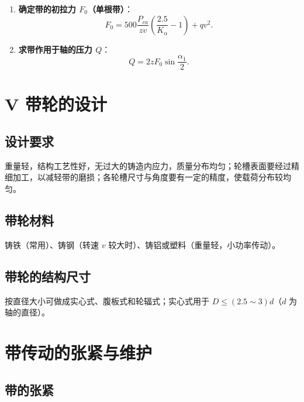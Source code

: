 \begin{enumerate}
	\item \textbf{确定带的初拉力 $F_0$（单根带）}：
	      \begin{equation}
		      F_0=500\frac{P_{ca}}{zv}\left(\frac{2.5}{K_\alpha}-1\right)+qv^2.
		      \label{eq:带传动:初拉力}
	      \end{equation}

	\item \textbf{求带作用于轴的压力 $Q$}：
	      \begin{equation}
		      Q=2zF_0\sin\frac{\alpha_1}{2}.
		      \label{eq:带传动:轴压力}
	      \end{equation}
\end{enumerate}

\section{V 带轮的设计}
\label{sec:带传动:带轮设计}

\subsection{设计要求}
\label{sec:带传动:带轮设计要求}

重量轻，结构工艺性好，无过大的铸造内应力，质量分布均匀；轮槽表面要经过精细加工，以减轻带的磨损；各轮槽尺寸与角度要有一定的精度，使载荷分布较均匀。

\subsection{带轮材料}
\label{sec:带传动:带轮材料}

铸铁（常用）、铸钢（转速 $v$ 较大时）、铸铝或塑料（重量轻，小功率传动）。

\subsection{带轮的结构尺寸}
\label{sec:带传动:带轮结构尺寸}

按直径大小可做成实心式、腹板式和轮辐式；实心式用于 $D\le(2.5\sim3)d$（$d$ 为轴的直径）。

\section{带传动的张紧与维护}
\label{sec:带传动:张紧与维护}

\subsection{带的张紧}
\label{sec:带传动:张紧}

